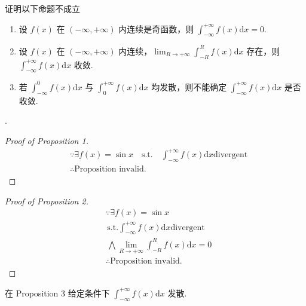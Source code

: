 \begin{example}
    证明以下命题不成立
    \begin{enumerate}
        \item 设 $f(x)$ 在 $(-\infty, +\infty)$ 内连续是奇函数，则 $\int_{-\infty}^{+\infty} f(x) \mathrm dx = 0$.
        \item 设 $f(x)$ 在 $(-\infty, +\infty)$ 内连续，$\lim_{R \to +\infty} \int_{-R}^{R} f(x) \mathrm dx$ 存在，则 $\int_{-\infty}^{+\infty} f(x) \mathrm dx$ 收敛.
        \item 若 $\int_{-\infty}^{0} f(x) \mathrm dx$ 与 $\int_0^{+\infty} f(x) \mathrm dx$ 均发散，则不能确定 $\int_{-\infty}^{+\infty}f(x) \mathrm dx$ 是否收敛.
    \end{enumerate}
    
    \cite[question 204]{w660}.

    \begin{proof}[Proof of Proposition 1]
        \begin{align*}
            &\because   \exists f(x) = \sin x \quad \mbox{s.t.} \quad \int_{-\infty}^{+\infty} f(x) \mathrm dx \mbox{divergent}\\
            &\therefore \mbox{Proposition invalid.}
        \end{align*}
    \end{proof}

    \begin{proof}[Proof of Proposition 2]
        \begin{align*}
            &\because   \exists f(x) = \sin x \\
            &{\,}\mbox{s.t.} 
                        \int_{-\infty}^{+\infty} f(x) \mathrm dx 
                        \mbox{divergent} \\
            &{\,}\bigwedge 
                        \lim_{R \to +\infty} \int_{-R}^{R} f(x) \mathrm dx = 0 \\
            &\therefore \mbox{Proposition invalid.}
        \end{align*}
    \end{proof}

    在 Proposition 3 给定条件下 $\int_{-\infty}^{+\infty}f(x) \mathrm dx$ 发散.
\end{example}
